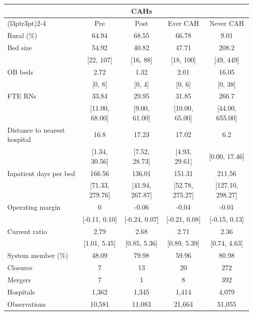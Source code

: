 \begin{tabular}[t]{lcccc}
\toprule
\multicolumn{1}{c}{ } & \multicolumn{3}{c}{CAHs} & \multicolumn{1}{c}{ } \\
\cmidrule(l{3pt}r{3pt}){2-4}
 & Pre & Post & Ever CAH & Never CAH\\
\midrule
Rural (\%) & 64.94 & 68.55 & 66.78 & 9.01 \\
Bed size & 54.92 & 40.82 & 47.71 & 208.2 \\
 & {}[22, 107] & {}[16, 88] & {}[18, 100] & {}[49, 449] \\
OB beds & 2.72 & 1.32 & 2.01 & 16.05 \\
 & {}[0, 8] & {}[0, 4] & {}[0, 6] & {}[0, 38] \\
FTE RNs & 33.84 & 29.95 & 31.85 & 266.7 \\
 & {}[11.00, 68.00] & {}[9.00, 61.00] & {}[10.00, 65.00] & {}[44.00, 655.00] \\
Distance to nearest hospital & 16.8 & 17.23 & 17.02 & 6.2 \\
 & {}[1.34, 30.56] & {}[7.52, 28.73] & {}[4.93, 29.61] & {}[0.00, 17.46] \\
Inpatient days per bed & 166.56 & 136.01 & 151.31 & 211.56 \\
 & {}[71.33, 279.76] & {}[41.94, 267.87] & {}[52.78, 275.27] & {}[127.10, 298.27] \\
Operating margin & 0 & -0.06 & -0.04 & -0.01 \\
 & {}[-0.11, 0.10] & {}[-0.24, 0.07] & {}[-0.21, 0.08] & {}[-0.15, 0.13] \\
Current ratio & 2.79 & 2.68 & 2.71 & 2.36 \\
 & {}[1.01, 5.45] & {}[0.85, 5.36] & {}[0.89, 5.39] & {}[0.74, 4.63] \\
System member (\%) & 48.09 & 79.98 & 59.96 & 80.98 \\
Closures & 7 & 13 & 20 & 272 \\
Mergers & 7 & 1 & 8 & 392 \\
\addlinespace
Hospitals & 1,362 & 1,345 & 1,414 & 4,079 \\
Observations & 10,581 & 11,083 & 21,664 & 51,055 \\
\bottomrule
\end{tabular}

